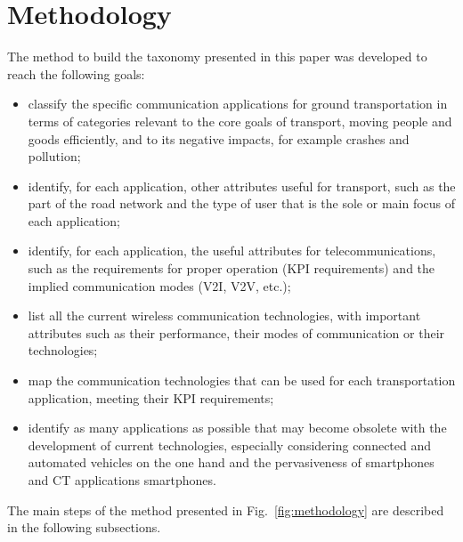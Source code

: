 \section{Methodology}\label{sec:methodology}

The method to build the taxonomy presented in this paper was developed to reach the following goals:

\begin{itemize}
\item classify the specific communication applications for ground transportation in terms of categories relevant to the core goals of transport, moving people and goods efficiently, and to its negative impacts, for example crashes and pollution;
\item identify, for each application, other attributes useful for transport, such as the part of the road network and the type of user that is the sole or main focus of each application;
\item identify, for each application, the useful attributes for telecommunications, such as the requirements for proper operation (\acrshort{KPI} requirements) and the implied communication modes (\acrfull{V2I}, \acrfull{V2V}, etc.);
\item list all the current wireless communication technologies, %
  with important attributes such as their performance, their modes of communication or their technologies;%
\item map the communication technologies that can be used for each transportation application, meeting their \acrshort{KPI} requirements;
\item identify as many applications as possible that may become obsolete with the development of current technologies, especially considering connected and automated vehicles on the one hand and the pervasiveness of smartphones and \acrshort{CT} applications smartphones.
\end{itemize}

The main steps of the method presented in Fig.~\ref{fig:methodology} are described in the following subsections. 

